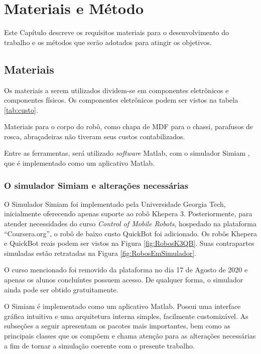 \chapter{Materiais e Método}
\vspace{-2.5 cm}

Este Capítulo descreve os requisitos materiais para o desenvolvimento do
trabalho e os métodos que serão adotados para atingir os objetivos. 

\section{Materiais}

Os materiais a serem utilizados dividem-se em componentes eletrônicos e
componentes físicos. Os componentes eletrônicos podem ser vistos na tabela \ref{tab:custo}.



Materiais para o corpo do robô, como chapa de MDF para o chassi, parafusos
de rosca, abraçadeiras não tiveram seus custos contabilizados.

Entre as ferramentas, será utilizado \textit{software} Matlab, com o
simulador Simiam \cite{Simiam}, que é implementado como um aplicativo Matlab.

\subsection{O simulador Simiam e alterações necessárias}

O Simulador Simiam foi implementado pela Universidade Georgia Tech, 
inicialmente oferecendo apenas suporte ao robô Khepera 3. Posteriormente, 
para atender necessidades do curso \textit{Control of Mobile Robots}, hospedado 
na plataforma ``Coursera.org'', o robô de baixo custo QuickBot foi adicionado. 
Os robôs Khepera e QuickBot reais podem ser vistos na Figura \ref{fig:RobosK3QB}. 
Suas contrapartes simuladas estão retratadas na Figura \ref{fig:RobosEmSimulador}.

O curso mencionado foi removido da plataforma no dia 17 de Agosto de 2020 e apenas
os alunos concluíntes possuem acesso. De qualquer forma, o simulador ainda pode ser
obtido gratuitamente.





O Simiam é implementado como um aplicativo Matlab. Possui uma interface
gráfica intuitiva e uma arquitetura interna simples, facilmente customizável. As
subseções a seguir apresentam os pacotes mais importantes, bem como as
principais classes que os compõem e chama atenção para as alterações necessárias
a fim de tornar a simulação coerente com o presente trabalho.

